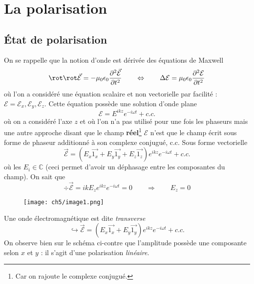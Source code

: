 \chapter{La polarisation}
\section{État de polarisation}
On se rappelle que la notion d'onde est dérivée des équations de Maxwell
\begin{equation}
\rot\rot\vec{\mathcal{E}} = -\mu_0\epsilon_0\dfrac{\partial^2\vec{\mathcal{E}}}{\partial t^2}\qquad\Leftrightarrow
\qquad \Delta\mathcal{E}= \mu_0\epsilon_0\dfrac{\partial^2\mathcal{E}}{\partial t^2}
\end{equation}
où l'on a considéré une équation scalaire et non vectorielle par facilité : $\mathcal{E} = \mathcal{E}_x
,\mathcal{E}_y, \mathcal{E}_z$. Cette équation possède une solution d'onde plane 
\begin{equation}
\mathcal{E} = E^{ikz}e^{-i\omega t} + c.c.
\end{equation}
où on a considéré l'axe $z$ et où l'on n'a pas utilisé pour une fois les phaseurs mais une autre approche disant 
que le champ \textbf{réel}\footnote{Car on rajoute le complexe conjugué.} $\mathcal{E}$ n'est que le champ écrit 
sous forme de phaseur additionné à son complexe conjugué, c.c. Sous forme vectorielle
\begin{equation}
\vec{\mathcal{E}} = (E_x\vec{1_x}+E_y\vec{1_y}+E_z\vec{1_z})e^{ikz}e^{-i\omega t} + c.c.
\end{equation}
où les $E_i\in\mathbb{C}$ (ceci permet d'avoir un déphasage entre les composantes du champ). On sait que
\begin{equation}
\div \vec{\mathcal{E}} = ikE_z e^{ikz}e^{-i\omega t} = 0\qquad\Rightarrow\qquad E_z=0
\end{equation}

	\begin{wrapfigure}[11]{r}{3.5cm}
	\vspace{-5mm}
	\texttt{[image: ch5/image1.png]}
	\end{wrapfigure}
Une onde électromagnétique est dite \textit{transverse}
\begin{equation}
\hookrightarrow \vec{\mathcal{E}} = (E_x\vec{1_x}+E_y\vec{1_y})e^{ikz}e^{-i\omega t} + c.c.
\end{equation}
On observe bien sur le schéma ci-contre que l'amplitude possède une composante selon $x$ et $y$ : il 
s'agit d'une polarisation \textit{linéaire}.

